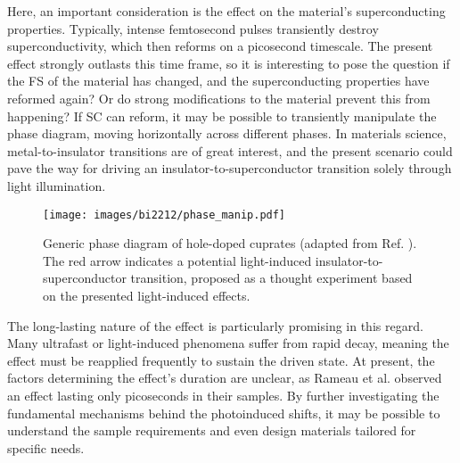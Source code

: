 Here, an important consideration is the effect on the material’s superconducting properties.
Typically, intense femtosecond pulses transiently destroy superconductivity, which then reforms on a picosecond timescale.
The present effect strongly outlasts this time frame, so it is interesting to pose the question if the FS of the material has changed, and the superconducting properties have reformed again?
Or do strong modifications to the material prevent this from happening?
If SC can reform, it may be possible to transiently manipulate the phase diagram, moving horizontally across different phases.
In materials science, metal-to-insulator transitions are of great interest, and the present scenario could pave the way for driving an insulator-to-superconductor transition solely through light illumination.

\begin{figure}
	\centering
	\texttt{[image: images/bi2212/phase\_manip.pdf]}
	\caption{Generic phase diagram of hole-doped cuprates (adapted from Ref. \cite{keimer_quantum_2015}). The red arrow indicates a potential light-induced insulator-to-superconductor transition, proposed as a thought experiment based on the presented light-induced effects.}
	\label{fig:phasemanip}
\end{figure}

The long-lasting nature of the effect is particularly promising in this regard.
Many ultrafast or light-induced phenomena suffer from rapid decay, meaning the effect must be reapplied frequently to sustain the driven state.
At present, the factors determining the effect’s duration are unclear, as Rameau et al. \cite{rameau_photoinduced_2014} observed an effect lasting only picoseconds in their samples.
By further investigating the fundamental mechanisms behind the photoinduced shifts, it may be possible to understand the sample requirements and even design materials tailored for specific needs.